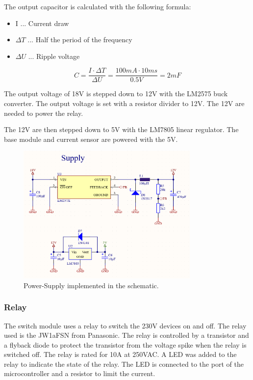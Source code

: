         The output capacitor is calculated with the following formula:

        \begin{itemize}
            \item I ... Current draw
            \item $\Delta T$ ... Half the period of the frequency
            \item $\Delta U$ ... Ripple voltage
        \end{itemize}

        \begin{equation}
            C = \frac{I \cdot \Delta T}{\Delta U} = \frac{100mA \cdot 10ms}{0.5V} = 2mF
        \end{equation}

        The output voltage of 18V is stepped down to 12V with the LM2575 buck converter. The output
        voltage is set with a resistor divider to 12V. The 12V are needed to power the relay.

        The 12V are then stepped down to 5V with the LM7805 linear regulator. The base module and 
        current sensor are powered with the 5V.

         \begin{figure}[H]
            \centering
            \includegraphics[width=0.8\textwidth]{assets/HW/Supply-schematic.png}
            \caption{Power-Supply implemented in the schematic.}
         \end{figure}

    \subsubsection{Relay}
        The switch module uses a relay to switch the 230V devices on and off. The relay used is 
        the JW1aFSN from Panasonic. The relay is controlled by a transistor and a flyback diode
        to protect the transistor from the voltage spike when the relay is switched off. The relay
        is rated for 10A at 250VAC. A LED was added to the relay to indicate the state of the relay. 
        The LED is connected to the port of the microcontroller and a resistor to limit the current.

